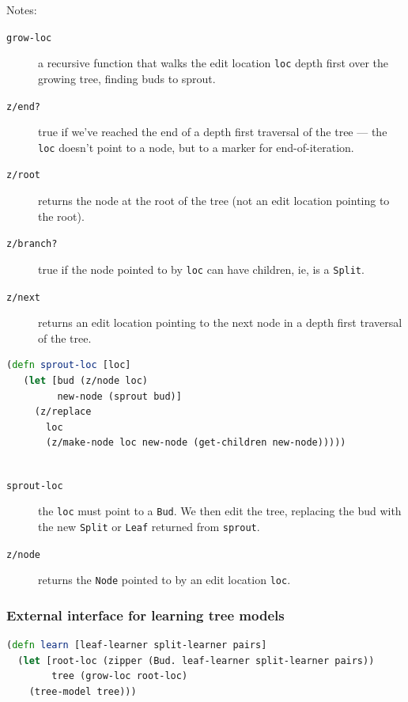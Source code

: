 \documentclass[11pt,openany,american,usenames,dvipsnames,svgnames,x11names,table,isodate]{article}
\numberwithin{equation}{section}
\numberwithin{figure}{section}
\begin{document}
Notes:
\begin{description}
\item [{\texttt{grow-loc}}] a recursive function that walks the edit location
\texttt{loc} depth first over the growing tree, finding buds to sprout.
\item [{\texttt{z/end?}}] true if we've reached the end of a depth first
traversal of the tree --- the \texttt{loc} doesn't point to a node,
but to a marker for end-of-iteration.
\item [{\texttt{z/root}}] returns the node at the root of the tree (not
an edit location pointing to the root).
\item [{\texttt{z/branch?}}] true if the node pointed to by \texttt{loc}
can have children, ie, is a \texttt{Split}. 
\item [{\texttt{z/next}}] returns an edit location pointing to the next
node in a depth first traversal of the tree.
\end{description}
\begin{minipage}[t]{1\columnwidth}%
\begin{lstlisting}[caption={Sprouting a bud using a zipper},label={lis:grow-loc-1},language=clojure,tabsize=2]
(defn sprout-loc [loc]
   (let [bud (z/node loc)
         new-node (sprout bud)]
     (z/replace 
       loc 
       (z/make-node loc new-node (get-children new-node)))))
 
\end{lstlisting}
%
\end{minipage}
\begin{description}
\item [{\texttt{sprout-loc}}] the \texttt{loc} must point to a \texttt{Bud}.
We then edit the tree, replacing the bud with the new \texttt{Split}
or \texttt{Leaf} returned from \texttt{sprout}.
\item [{\texttt{z/node}}] returns the \texttt{Node} pointed to by an edit
location \texttt{loc}.
\end{description}

\subsubsection{External interface for learning tree models}
\begin{minipage}[t]{1\columnwidth}%
\begin{lstlisting}[caption={Tree learner},label={lis:tree-learner},language=clojure,tabsize=2]
(defn learn [leaf-learner split-learner pairs]
  (let [root-loc (zipper (Bud. leaf-learner split-learner pairs))
        tree (grow-loc root-loc)
    (tree-model tree))) 
\end{lstlisting}
%
\end{minipage}
\end{document}
